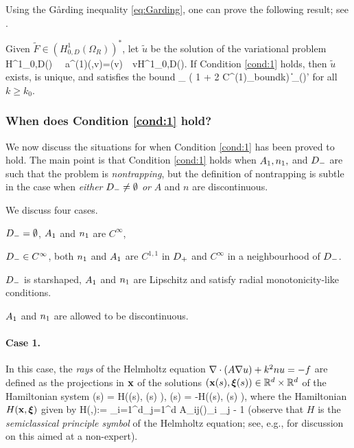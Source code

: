 Using the G\aa rding inequality \eqref{eq:Garding}, one can prove the following result; see \cite[Lemma 5.1]{GrPeSp:19}.

\label{lem:H1}
Given $\widetilde{F}\in (H^1_{0,D}(\Omega_R))^*$, let $\widetilde{u}$ be the solution of the variational problem
\beqs
{} \,\, \in H^1_{0,D}(\DR) \,\,\tst \,\,
a^{(1)}(,v)=(v) \,\, \tfa v\in H^1_{0,D}(\DR).
\eeqs
If Condition \ref{cond:1} holds, then $\widetilde{u}$ exists, is unique, and satisfies the bound
\beq\label{eq:bound2}
_{\HokDR} \leq {}\left( 1 + 2 C^{(1)}_{\rm bound}\nomax  k\right) \big\|\big\|_{(\HokDR)'}
\eeq
for all $k\geq k_0$.
\ele


\subsubsection{When does Condition \ref{cond:1} hold?}\label{sec:cond1hold}

We now discuss the situations for when Condition \ref{cond:1} has been proved to hold. The main point is that Condition \ref{cond:1} holds when $A_{1}, n_{1},$ and $D_{-}$ are such that the problem is \emph{nontrapping}, but the definition of nontrapping is subtle in the case when \emph{either} $D_{-} \neq\emptyset$ \emph{or} $A$ and $n$ are discontinuous.

We discuss four cases.
\ben
\item[Case 1:] $D_{-}=\emptyset$, $A_{1}$ and $n_{1}$ are $C^\infty$,
\item[Case 2:] $D_{-}\in C^\infty$, both $n_{1}$ and $A_{1}$ are $C^{1,1}$ in $D_{+}$ and $C^\infty$ in a neighbourhood of $D_{-}$.
\item[Case 3:] $D_{-}$ is starshaped, $A_{1}$ and $n_{1}$ are Lipschitz and satisfy radial monotonicity-like conditions.
\item[Case 4:] $A_{1}$ and $n_{1}$ are allowed to be discontinuous.
\een

\paragraph{Case 1.}
In this case, %
the \emph{rays} of the Helmholtz equation $\nabla\cdot(A\nabla u)+ k^2 nu =-f$ are defined as the projections in $\mathbf{x}$ of the solutions $(\mathbf{x}(s), \boldsymbol{\xi}(s)) \in \mathbb R^{d}\times \mathbb R^{d}$ of the Hamiltonian system
\beq\label{eq:rays}
(s) = H\big(\bx(s), \bxi(s) \big), \qquad
(s)
 = -H\big(\bx(s), \bxi(s) \big),
\eeq
where the Hamiltonian $H(\mathbf{x},\boldsymbol{\xi})$ given by 
\beqs
H(\bx,\bxi):= \sum_{i=1}^d\sum_{j=1}^{d} A_{ij}(\bx)\xi_i \xi_j - 1%
\eeqs
(observe that $H$ is the \emph{semiclassical principle symbol} of the Helmholtz equation; see, e.g., \cite[\S7]{GrPeSp:19} for discussion on this aimed at a non-expert).

